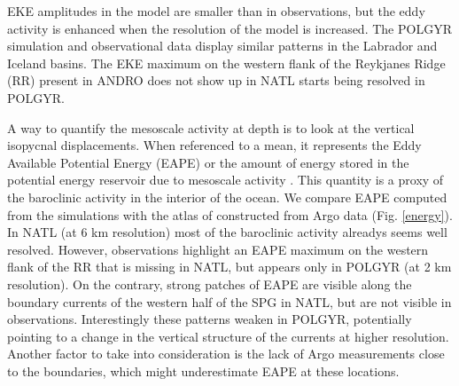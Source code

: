 \documentclass[11pt,a4paper]{article}
\begin{document}
EKE amplitudes in the model are smaller than in observations, but the eddy activity is enhanced when the resolution of the model is increased. The POLGYR simulation and observational data display similar patterns in the Labrador and Iceland basins. The EKE maximum on the western flank of the Reykjanes Ridge (RR) present in ANDRO does not show up in NATL starts being resolved in POLGYR. 


A way to quantify the mesoscale activity at depth is to look at the vertical isopycnal displacements. When referenced to a mean, it represents the Eddy Available Potential Energy (EAPE) or the amount of energy stored in the potential energy reservoir due to mesoscale activity \cite{lorenz1955}. This quantity is a proxy of the baroclinic activity in the interior of the ocean. We compare EAPE computed from the simulations with the atlas of \citet{roullet2014} constructed from Argo data (Fig. \ref{energy}). In NATL (at 6 km resolution) most of the baroclinic activity alreadys seems well resolved. However, observations highlight an EAPE maximum on the western flank of the RR that is missing in NATL, but appears only in POLGYR (at 2 km resolution). On the contrary, strong patches of EAPE are visible along the boundary currents of the western half of the SPG in NATL, but are not visible in observations. Interestingly these patterns weaken in POLGYR, potentially pointing to a change in the vertical structure of the currents at higher resolution. Another factor to take into consideration is the lack of Argo measurements close to the boundaries, which might underestimate EAPE at these locations.
\end{document}
